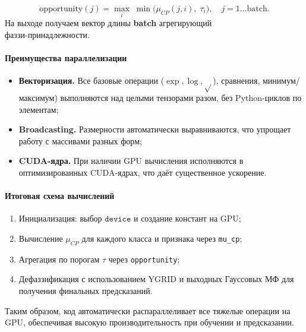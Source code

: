 \begin{definition}
\[
  \mathrm{opportunity}(j) 
  = \max_{i}\;\min\bigl(\mu_{CP}(j,i),\;\tau_i\bigr),
  \quad j=1\ldots\text{batch}.
\]
На выходе получаем вектор длины \textbf{batch} агрегирующий \\ фаззи-принадлежности.
\end{definition}

\paragraph{Преимущества параллелизации}

\begin{itemize}
  \item \textbf{Векторизация.} Все базовые операции ($\exp, \log, \sqrt{}$), сравнения, минимум/максимум) выполняются над целыми тензорами разом, без Python-циклов по элементам;
  \item \textbf{Broadcasting.} Размерности автоматически выравниваются, что упрощает работу с массивами разных форм;
  \item \textbf{CUDA-ядра.} При наличии GPU вычисления исполняются в оптимизированных CUDA-ядрах, что даёт существенное ускорение.
\end{itemize}

\paragraph{Итоговая схема вычислений}
\begin{enumerate}
  \item Инициализация: выбор \(\texttt{device}\) и создание констант на GPU;
  \item Вычисление \(\mu_{CP}\) для каждого класса и признака через \verb|mu_cp|;
  \item Агрегация по порогам \(\tau\) через \verb|opportunity|;
  \item Дефаззификация с использованием \(\mathrm{YGRID}\) и выходных Гауссовых МФ для получения финальных предсказаний.
\end{enumerate}

Таким образом, код автоматически распараллеливает все тяжелые операции на GPU, обеспечивая высокую производительность при обучении и предсказании.



